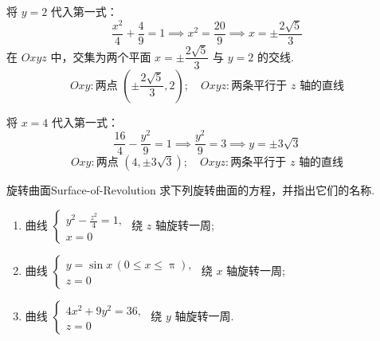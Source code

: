 \begin{solution}

    将 $y=2$ 代入第一式：
    \begin{equation*}
        \dfrac{x^2}{4} + \dfrac{4}{9} = 1 \implies x^2 = \dfrac{20}{9} \implies x = \pm \dfrac{2\sqrt{5}}{3}
    \end{equation*}
    在 $Oxyz$ 中，交集为两个平面 $x = \pm \dfrac{2\sqrt{5}}{3}$ 与 $y=2$ 的交线.
    \begin{equation*}
        \boxed{Oxy: \text{两点 } \left( \pm \dfrac{2\sqrt{5}}{3}, 2 \right); \quad Oxyz: \text{两条平行于 } z \text{ 轴的直线}}
    \end{equation*}


    将 $x=4$ 代入第一式：
    \begin{equation*}
        \dfrac{16}{4} - \dfrac{y^2}{9} = 1 \implies \dfrac{y^2}{9} = 3 \implies y = \pm 3\sqrt{3}
    \end{equation*}
    \begin{equation*}
        \boxed{Oxy: \text{两点 } (4, \pm 3\sqrt{3}); \quad Oxyz: \text{两条平行于 } z \text{ 轴的直线}}
    \end{equation*}
\end{solution}


\begin{problem}{旋转曲面}{Surface-of-Revolution}
    求下列旋转曲面的方程，并指出它们的名称.
    \begin{enumerate}
        \item 曲线 $\begin{cases} y^2 - \frac{z^2}{4} = 1, \\ x = 0 \end{cases}$ 绕 $z$ 轴旋转一周;
        \item 曲线 $\begin{cases} y = \sin x \, (0 \le x \le \uppi), \\ z = 0 \end{cases}$ 绕 $x$ 轴旋转一周;
        \item 曲线 $\begin{cases} 4x^2 + 9y^2 = 36, \\ z = 0 \end{cases}$ 绕 $y$ 轴旋转一周.
    \end{enumerate}
\end{problem}


